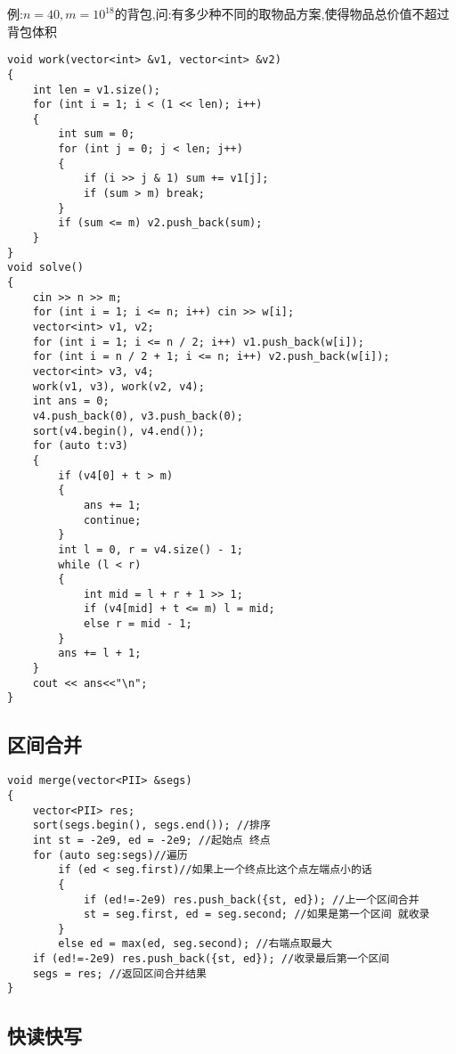 \documentclass[a4paper,fontset=none]{ctexart}
\begin{document}
例:$n=40,m=10^{18}$的背包,问:有多少种不同的取物品方案,使得物品总价值不超过背包体积

\begin{verbatim}
void work(vector<int> &v1, vector<int> &v2)
{
    int len = v1.size();
    for (int i = 1; i < (1 << len); i++)
    {
        int sum = 0;
        for (int j = 0; j < len; j++)
        {
            if (i >> j & 1) sum += v1[j];
            if (sum > m) break;
        }
        if (sum <= m) v2.push_back(sum);
    }
}
void solve()
{
    cin >> n >> m;
    for (int i = 1; i <= n; i++) cin >> w[i];
    vector<int> v1, v2;
    for (int i = 1; i <= n / 2; i++) v1.push_back(w[i]);
    for (int i = n / 2 + 1; i <= n; i++) v2.push_back(w[i]);
    vector<int> v3, v4;
    work(v1, v3), work(v2, v4);
    int ans = 0;
    v4.push_back(0), v3.push_back(0);
    sort(v4.begin(), v4.end());
    for (auto t:v3)
    {
        if (v4[0] + t > m)
        {
            ans += 1;
            continue;
        }
        int l = 0, r = v4.size() - 1;
        while (l < r)
        {
            int mid = l + r + 1 >> 1;
            if (v4[mid] + t <= m) l = mid;
            else r = mid - 1;
        }
        ans += l + 1;
    }
    cout << ans<<"\n";
}
\end{verbatim}
\subsection{区间合并}

\begin{verbatim}
void merge(vector<PII> &segs)
{
    vector<PII> res;
    sort(segs.begin(), segs.end()); //排序
    int st = -2e9, ed = -2e9; //起始点 终点
    for (auto seg:segs)//遍历
        if (ed < seg.first)//如果上一个终点比这个点左端点小的话
        {
            if (ed!=-2e9) res.push_back({st, ed}); //上一个区间合并
            st = seg.first, ed = seg.second; //如果是第一个区间 就收录
        }
        else ed = max(ed, seg.second); //右端点取最大
    if (ed!=-2e9) res.push_back({st, ed}); //收录最后第一个区间
    segs = res; //返回区间合并结果
}
\end{verbatim}
\subsection{快读快写}
\end{document}
